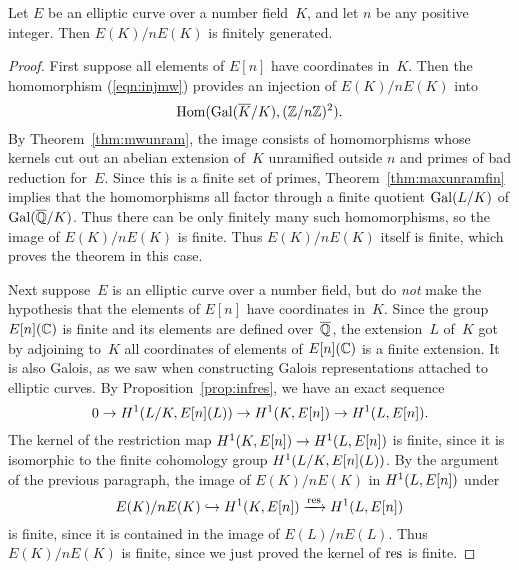 \begin{theorem}\label{thm:weakMW}
  Let $E$ be an elliptic curve over a number field~$K$, and
  let $n$ be any positive integer.  Then
  $E(K)/nE(K)$ is finitely generated.
\end{theorem}
\begin{proof}
  First suppose all elements of $E[n]$ have coordinates in~$K$.  Then
  the homomorphism (\ref{eqn:injmw}) provides an injection of $E(K)/n
  E(K)$ into
  \[
    \operatorname{Hom}(\operatorname{Gal}(\overline{K}/K), (\mathbb{Z}/n\mathbb{Z})^2).
  \]
  By Theorem~\ref{thm:mwunram}, the image consists of homomorphisms whose
  kernels cut out an abelian extension of~$K$ unramified outside $n$
  and primes of bad reduction for~$E$.  Since this is a finite set of
  primes, Theorem~\ref{thm:maxunramfin} implies that the homomorphisms
  all factor through a finite quotient $\operatorname{Gal}(L/K)$ of $\operatorname{Gal}(\overline{\mathbb{Q}}/K)$.
  Thus there can be only finitely many such homomorphisms, so the
  image of $E(K)/nE(K)$ is finite.  Thus $E(K)/nE(K)$ itself is
  finite, which proves the theorem in this case.

  Next suppose~$E$ is an elliptic curve over a number field, but do {\em
    not} make the hypothesis that the elements of $E[n]$ have
  coordinates in~$K$.  Since the group $E[n](\mathbb{C})$ is finite and its
  elements are defined over~$\overline{\mathbb{Q}}$, the extension~$L$ of~$K$ got by
  adjoining to~$K$ all coordinates of elements of $E[n](\mathbb{C})$ is a finite
  extension.  It is also Galois, as we saw when constructing Galois
  representations attached to elliptic curves.
  By Proposition~\ref{prop:infres}, we have an exact sequence
  \[
    0 \to H^1(L/K, E[n](L)) \to H^1(K,E[n])\to H^1(L,E[n]).
  \]
  The kernel of the restriction map
  $H^1(K,E[n])\to H^1(L,E[n])$ is finite, since it is
  isomorphic to the finite cohomology group
  $H^1(L/K, E[n](L))$.  By the argument of the previous
  paragraph, the image of $E(K)/nE(K)$ in $H^1(L,E[n])$
  under
  \[
    E(K)/n E(K) \hookrightarrow H^1(K,E[n]) \xrightarrow{\operatorname{res}} H^1(L,E[n])
  \]
  is finite, since it is contained in the image of $E(L)/n E(L)$.
  Thus $E(K)/n E(K)$ is finite, since we just proved
  the kernel of $\operatorname{res}$ is finite.
\end{proof}
